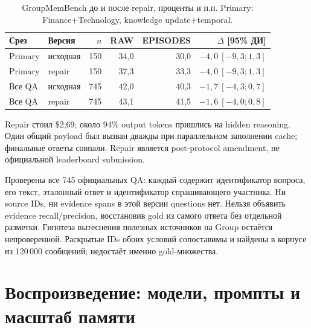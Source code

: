 \documentclass[11pt,a4paper]{article}
\begin{document}
\begin{table}[ht]
\centering\small
\begin{tabular}{llrrrr}
\toprule
Срез & Версия & $n$ & RAW & EPISODES & $\Delta$ [95\% ДИ]\\
\midrule
Primary & исходная & 150 & 34{,}0 & 30{,}0 & $-4{,}0\ [-9{,}3;1{,}3]$\\
Primary & repair & 150 & 37{,}3 & 33{,}3 & $-4{,}0\ [-9{,}3;1{,}3]$\\
Все QA & исходная & 745 & 42{,}0 & 40{,}3 & $-1{,}7\ [-4{,}3;0{,}7]$\\
Все QA & repair & 745 & 43{,}1 & 41{,}5 & $-1{,}6\ [-4{,}0;0{,}8]$\\
\bottomrule
\end{tabular}
\caption{GroupMemBench до и после repair, проценты и п.п.
Primary: Finance+Technology, knowledge update+temporal.}
\end{table}

Repair стоил \$2,69; около 94\% output tokens пришлись на hidden reasoning.
Один общий payload был вызван дважды при параллельном заполнении cache;
финальные ответы совпали. Repair является post-protocol amendment,
не официальной leaderboard submission.

Проверены все 745 официальных QA: каждый содержит идентификатор вопроса,
его текст, эталонный ответ и идентификатор спрашивающего участника.
Ни source IDs, ни evidence spans в этой версии questions нет.
Нельзя объявить evidence recall/precision, восстановив gold из самого
ответа без отдельной разметки. Гипотеза вытеснения полезных источников
на Group остаётся непроверенной. Раскрытые IDs обоих условий сопоставимы
и найдены в корпусе из 120\,000 сообщений; недостаёт именно gold-множества.

\section{Воспроизведение: модели, промпты и масштаб памяти}
\label{app:reproduce}
\end{document}
